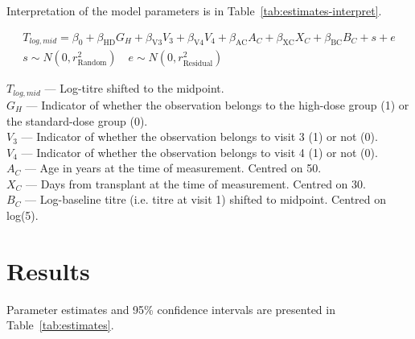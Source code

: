\documentclass[11pt]{article}
\begin{document}
Interpretation of the model parameters is in
Table~\ref{tab:estimates-interpret}.

\begin{equation}
    \begin{gathered}
        \label{eq:model}
        T_{log,mid} = \beta_0 + \beta_{\text{HD}}G_H + \beta_{\text{V3}}V_3
        + \beta_{\text{V4}}V_4 + \beta_{\text{AC}}A_C
        + \beta_{\text{XC}}X_C + \beta_{\text{BC}}B_C
        + s + e\\
        s \sim N(0, r^2_{\text{Random}}) \quad e \sim N(0, r^2_{\text{Residual}})
    \end{gathered}
\end{equation}

$T_{log,mid}$ --- Log-titre shifted to the midpoint.\\
$G_H$ --- Indicator of whether the observation belongs to the
high-dose group (1) or the standard-dose group (0).\\
$V_3$ --- Indicator of whether the observation belongs to
visit 3 (1) or not (0).\\
$V_4$ --- Indicator of whether the observation belongs to
visit 4 (1) or not (0).\\
$A_C$ --- Age in years at the time of measurement. Centred on 50.\\
$X_C$ --- Days from transplant at the time of measurement. Centred on 30.\\
$B_C$ --- Log-baseline titre (i.e. titre at visit 1) shifted to midpoint.
Centred on log(5).


\section{Results}

Parameter estimates and 95\% confidence intervals
are presented in Table~\ref{tab:estimates}.




\end{document}
